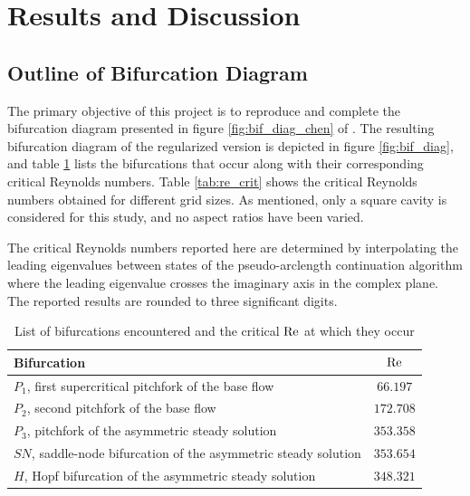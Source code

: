 
\section{Results and Discussion} \label{sec:res}

\subsection{Outline of Bifurcation Diagram}

The primary objective of this project is to reproduce and complete the
bifurcation diagram presented in figure \ref{fig:bif_diag_chen} of
\citet{chen2013}. The resulting bifurcation diagram of the regularized version
is depicted in figure \ref{fig:bif_diag}, and table \ref{tab:bif_points} lists
the bifurcations that occur along with their corresponding critical Reynolds
numbers. Table \ref{tab:re_crit} shows the critical Reynolds numbers obtained
for different grid sizes. As mentioned, only a square cavity is considered for
this study, and no aspect ratios have been varied.

The critical Reynolds numbers reported here are determined by interpolating the
leading eigenvalues between states of the pseudo-arclength continuation
algorithm where the leading eigenvalue crosses the imaginary axis in the
complex plane. The reported results are rounded to three significant digits.

\begin{table}[h!]
  \centering
  \caption{List of bifurcations encountered and the critical $\mathrm{Re}$ at which they
    occur}
  \label{tab:bif_points}
\begin{tabular}{l c}
Bifurcation & $\mathrm{Re}$\\
\hline
$P_1$, first supercritical pitchfork of the base flow & $66.197$ \\
$P_2$, second pitchfork of the base flow & $172.708$ \\
$P_3$, pitchfork of the asymmetric steady solution & $353.358$ \\
$SN$, saddle-node bifurcation of the asymmetric steady solution & $353.654$ \\
$H$, Hopf bifurcation of the asymmetric steady solution & $348.321$ \\
\end{tabular}
\end{table}

